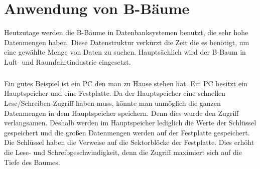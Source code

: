 \chapter{Anwendung von B-B\"aume}

Heutzutage werden die B-B\"aume in Datenbanksystemen benutzt, die sehr hohe Datenmengen haben. Diese Datenstruktur verk\"urzt die Zeit die es ben\"otigt, um eine gew\"ahlte Menge von Daten zu suchen. Haupts\"achlich wird der B-Baum in Luft- und Raumfahrtindustrie eingesetzt.

\paragraph{}
Ein gutes Beispiel ist ein PC den man zu Hause stehen hat. Ein PC besitzt ein Hauptspeicher und eine Festplatte. Da der Hauptspeicher eine schnellen Lese/Schreiben-Zugriff haben muss, k\"onnte man unm\"oglich die ganzen Datenmengen in dem Hauptspeicher speichern. Denn dies wurde den Zugriff verlangsamen. Deshalb werden im Hauptspeicher lediglich die Werte der Schl\"ussel gespeichert und die gro\ss en Datenmengen werden auf der Festplatte gespeichert. Die Schl\"ussel haben die Verweise auf die Sektorbl\"ocke der Festplatte. Dies erh\"oht die Lese- und Schreibgeschwindigkeit, denn die Zugriff maximiert sich auf die Tiefe des Baumes.